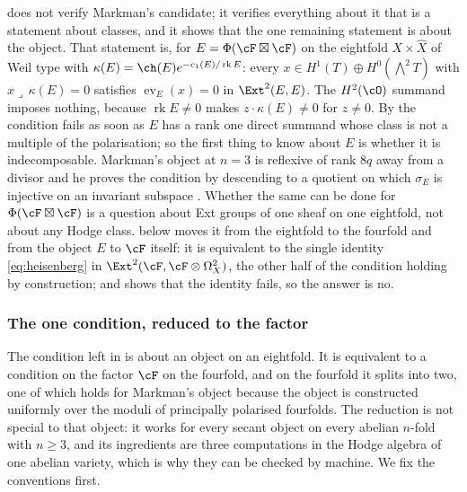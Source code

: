 \begin{remark}\label{rem:onecondition}
 does not verify Markman's candidate; it verifies
everything about it that is a statement about classes, and it shows that the
one remaining statement is about the object. That statement is, for
$E=\Phi(\cF\boxtimes\cF)$ on the eightfold $X\times\widehat X$ of Weil type
with $\kappa(E)=\ch(E)e^{-c_{1}(E)/\operatorname{rk}E}$: every
$x\in H^{1}(T)\oplus H^{0}(\bigwedge^{2}T)$ with $x\lrcorner\,\kappa(E)=0$
satisfies $\operatorname{ev}_{E}(x)=0$ in $\Ext^{2}(E,E)$. The $H^{2}(\cO)$
summand imposes nothing, because $\operatorname{rk}E\ne0$ makes
$z\cdot\kappa(E)\ne0$ for $z\ne0$. By  the condition
fails as soon as $E$ has a rank one direct summand whose class is not a
multiple of the polarisation; so the first thing to know about $E$ is
whether it is indecomposable. Markman's object at $n=3$ is reflexive of
rank $8q$ away from a divisor and he proves the condition by descending to
a quotient on which $\sigma_{E}$ is injective on an invariant subspace
\cite[Proposition 11.5]{Mar25b}. Whether the same can be done for
$\Phi(\cF\boxtimes\cF)$ is a question about Ext groups of one sheaf on one
eightfold, not about any Hodge class.  below moves it from
the eightfold to the fourfold and from the object $E$ to $\cF$ itself: it is
equivalent to the single identity \eqref{eq:heisenberg} in
$\Ext^{2}(\cF,\cF\otimes\Omega^{2}_{X})$, the other half of the condition
holding by construction; and  shows that the
identity fails, so the answer is no.
\end{remark}

\subsubsection*{The one condition, reduced to the factor}

The condition left in  is about an object on an
eightfold. It is equivalent to a condition on the factor $\cF$ on the
fourfold, and on the fourfold it splits into two, one of which holds for
Markman's object because the object is constructed uniformly over the moduli
of principally polarised fourfolds. The reduction is not special to that
object: it works for every secant object on every abelian $n$-fold with
$n\ge3$, and its ingredients are three computations in the Hodge algebra of
one abelian variety, which is why they can be checked by machine. We fix the
conventions first.

